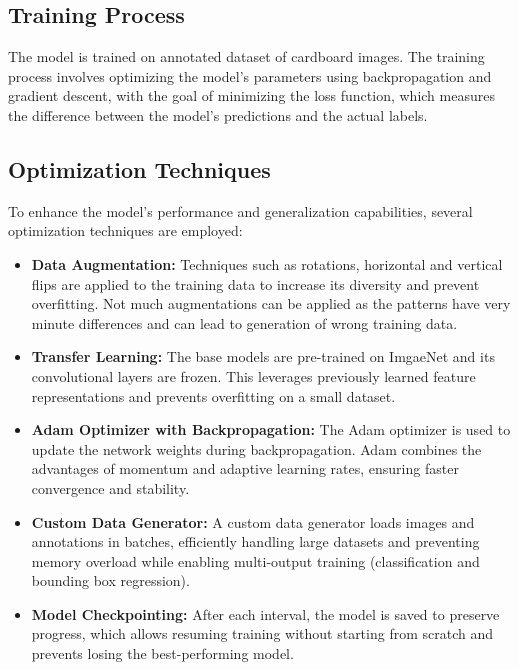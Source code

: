\subsection{Training Process}
The model is trained on annotated dataset of cardboard images. The training process involves optimizing the model's parameters using backpropagation and gradient descent, with the goal of minimizing the loss function, which measures the difference between the model's predictions and the actual labels.

\subsection{Optimization Techniques}
To enhance the model's performance and generalization capabilities, several optimization techniques are employed:

\begin{itemize}
	\item \textbf{Data Augmentation:}
	Techniques such as rotations, horizontal and vertical flips are applied to the training data to increase its diversity and prevent overfitting. Not much augmentations can be applied as the patterns have very minute differences and can lead to generation of wrong training data.
	\item \textbf{Transfer Learning: } The base models are pre-trained on ImgaeNet and its convolutional layers are frozen. This leverages previously learned feature representations and prevents overfitting on a small dataset.
	\item \textbf{Adam Optimizer with Backpropagation: }
	The Adam optimizer is used to update the network weights during backpropagation. Adam combines the advantages of momentum and adaptive learning rates, ensuring faster convergence and stability.
	\item \textbf{Custom Data Generator: }
	A custom data generator loads images and annotations in batches, efficiently handling large datasets and preventing memory overload while enabling multi-output training (classification and bounding box regression).
	\item \textbf{Model Checkpointing:}
	After each interval, the model is saved to preserve progress, which allows resuming training without starting from scratch and prevents losing the best-performing model.
	
	
\end{itemize}	


